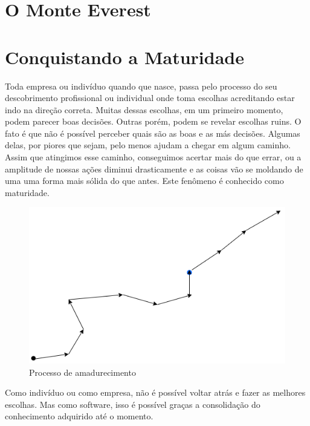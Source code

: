 
\section{O Monte Everest}

\section{Conquistando a Maturidade}

Toda empresa ou indivíduo quando que nasce, passa pelo processo do seu descobrimento profissional ou individual onde toma escolhas acreditando estar indo na direção correta. Muitas dessas escolhas, em um primeiro momento, podem parecer boas decisões. Outras porém, podem se revelar escolhas ruins. O fato é que não é possível perceber quais são as boas e as más decisões. Algumas delas, por piores que sejam, pelo menos ajudam a chegar em algum caminho. Assim que atingimos esse caminho, conseguimos acertar mais do que errar, ou a amplitude de nossas ações diminui drasticamente e as coisas vão se moldando de uma uma forma mais sólida do que antes. Este fenômeno é conhecido como maturidade.

\begin{figure}[H]
    \centering
    \includegraphics[scale=0.60,keepaspectratio=true]{images/01.png}
    \caption{Processo de amadurecimento}
    \label{mature_process}
\end{figure}

Como indivíduo ou como empresa, não é possível voltar atrás e fazer as melhores escolhas. Mas como software, isso é possível graças a consolidação do conhecimento adquirido até o momento.

